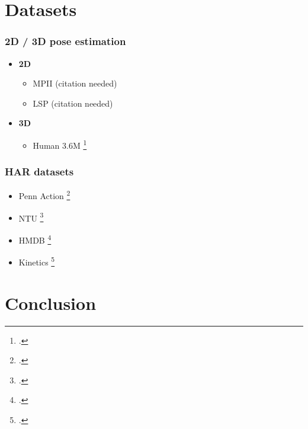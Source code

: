 \documentclass[9pt]{beamer}
\providecommand{\fcite}[1]{\footcite{#1}}
\newenvironment{myframe}[1][]{%
\begin{frame}%
\frametitle{#1}
\setcounter{footnote}{0}


}{%
\end{frame}%
}
\begin{document}
\section{Datasets}
\begin{myframe}[2D / 3D pose estimation]
  \begin{itemize}
      \item \textbf{2D}
      \begin{itemize}
          \item MPII (citation needed)
          \item LSP (citation needed)
      \end{itemize}
      \item \textbf{3D}
      \begin{itemize}
          \item Human 3.6M \fcite{ionescu_human3.6m:_2014}
      \end{itemize}
  \end{itemize}
\end{myframe}

\begin{myframe}[HAR datasets]
  \begin{itemize}
      \item Penn Action \fcite{zhang_actemes_2013}
      \item NTU \fcite{shahroudy_ntu_2016}
      \item HMDB \fcite{kuehne_hmdb:_2011}
      \item Kinetics \fcite{kay_kinetics_2017}
  \end{itemize}
\end{myframe}

\section{Conclusion}

%
%

\end{document}
